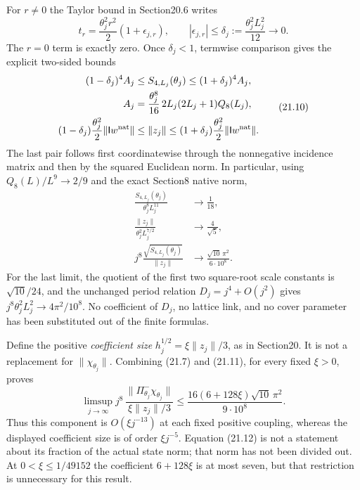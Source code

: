 \documentclass[
]{article}
\begin{document}
For \(r\ne0\) the Taylor bound in Section20.6 writes \[
t_r=\frac{\theta_j^2r^2}{2}(1+\epsilon_{j,r}),\qquad
|\epsilon_{j,r}|\le\delta_j:=\frac{\theta_j^2L_j^2}{12}\longrightarrow0.
\] The \(r=0\) term is exactly zero. Once \(\delta_j<1\), termwise
comparison gives the explicit two-sided bounds \[
\begin{aligned}
(1-\delta_j)^4 A_j&\le S_{4,L_j}(\theta_j)
                                      \le(1+\delta_j)^4 A_j,\\
A_j&=\frac{\theta_j^8}{16}\,2L_j(2L_j+1)Q_8(L_j),\\
(1-\delta_j)\frac{\theta_j^2}{2}\|\mathsf Iw^{\rm nat}\|
 &\le\|z_j\|
 \le(1+\delta_j)\frac{\theta_j^2}{2}\|\mathsf Iw^{\rm nat}\|.
\end{aligned}                                                 \tag{21.10}
\] The last pair follows first coordinatewise through the nonnegative
incidence matrix and then by the squared Euclidean norm. In particular,
using \(Q_8(L)/L^9\to2/9\) and the exact Section8 native norm, \[
\begin{aligned}
\frac{S_{4,L_j}(\theta_j)}{\theta_j^8L_j^{11}}&\longrightarrow\frac1{18},\\
\frac{\|z_j\|}{\theta_j^2L_j^{7/2}}&\longrightarrow\frac4{\sqrt5},\\
j^8\frac{\sqrt{S_{4,L_j}(\theta_j)}}{\|z_j\|}
 &\longrightarrow\frac{\sqrt{10}\,\pi^2}{6\cdot10^8}.
\end{aligned}                                                 \tag{21.11}
\] For the last limit, the quotient of the first two square-root scale
constants is \(\sqrt{10}/24\), and the unchanged period relation
\(D_j=j^4+O(j^2)\) gives \(j^8\theta_j^2L_j^2\to4\pi^2/10^8\). No
coefficient of \(D_j\), no lattice link, and no cover parameter has been
substituted out of the finite formulas.

Define the positive \emph{coefficient size} \(h_j^{1/2}=\xi\|z_j\|/3\),
as in Section20. It is not a replacement for \(\|\chi_{\theta_j}\|\).
Combining (21.7) and (21.11), for every fixed \(\xi>0\), proves \[
\limsup_{j\to\infty}
 j^8\,\frac{\|\Pi_{\theta_j}^-\chi_{\theta_j}\|}{\xi\|z_j\|/3}
 \le\frac{16(6+128\xi)\sqrt{10}\,\pi^2}{9\cdot10^8}.
                                                               \tag{21.12}
\] Thus this component is \(O(\xi j^{-13})\) at each fixed positive
coupling, whereas the displayed coefficient size is of order
\(\xi j^{-5}\). Equation (21.12) is not a statement about its fraction
of the actual state norm; that norm has not been divided out. At
\(0<\xi\le1/49152\) the coefficient \(6+128\xi\) is at most seven, but
that restriction is unnecessary for this result.
\end{document}
